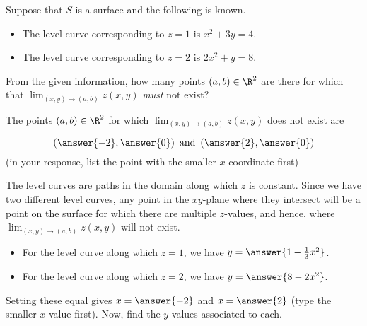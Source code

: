 \documentclass{ximera}
\author{Jim Talamo}
\newcommand{\point}[1]{\left(#1\right)} %
\begin{document}
\begin{exercise}
Suppose that $S$ is a surface and the following is known.

\begin{itemize}
\item The level curve corresponding to $z=1$ is $x^2+3y=4$.
\item The level curve corresponding to $z=2$ is $2x^2+y=8$.
\end{itemize}

From the given information, how many points $(a,b) \in \R^2$ are there for which that $\lim_{\point{x,y} \to \point{a,b}} z(x,y)$ \emph{must} not exist?

\begin{multipleChoice}
\end{multipleChoice}

\begin{exercise}
The points $(a,b) \in \R^2$ for which $\lim_{\point{x,y} \to \point{a,b}} z(x,y)$ does not exist are 

\[
\left(\answer{-2},\answer{0}\right) \textrm{ and } \left(\answer{2},\answer{0}\right)
\]
(in your response, list the point with the smaller $x$-coordinate first)



\begin{hint}
The level curves are paths in the domain along which $z$ is constant.  Since we have two different level curves, any point in the $xy$-plane where they intersect will be a point on the surface for which there are multiple $z$-values, and hence, where $\lim_{\point{x,y} \to \point{a,b}} z(x,y)$ will not exist.

\begin{itemize}
\item For the level curve along which $z=1$, we have $y = \answer{1-\frac{1}{3}x^2}$.
\item For the level curve along which $z=2$, we have $y = \answer{8-2x^2}$.
\end{itemize}

Setting these equal gives $x=\answer{-2}$ and $x=\answer{2}$ (type the smaller $x$-value first).  Now, find the $y$-values associated to each.
\end{hint}

\end{exercise}

\end{exercise}
\end{document}
